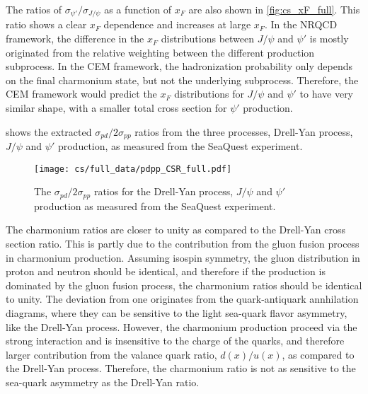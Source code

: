 \documentclass[../main.tex]{subfiles}
\begin{document}
The ratios of $\sigma_{\psi'}/\sigma_{J/\psi}$ as a function of $x_F$ are also shown in \cref{fig:cs_xF_full}.
This ratio shows a clear $x_F$ dependence and increases at large $x_F$. In the NRQCD framework,
the difference in the $x_F$ distributions between $J/\psi$ and $\psi'$ is mostly originated
from the relative weighting between the different production subprocess.
In the CEM framework, the hadronization probability only depends on
the final charmonium state, but not the underlying subprocess. Therefore, the CEM framework would predict
the $x_F$ distributions for $J/\psi$ and $\psi'$ to have very similar shape, with a smaller total cross section
for $\psi'$ production.

 shows the extracted $\sigma_{pd}/2\sigma_{pp}$ ratios from the three processes,
Drell-Yan process, $J/\psi$ and $\psi'$ production, as measured from the SeaQuest experiment.
\begin{figure}[h!]
	\centering
	\texttt{[image: cs/full\_data/pdpp\_CSR\_full.pdf]}
	\caption{The $\sigma_{pd}/2\sigma_{pp}$ ratios for the Drell-Yan process, $J/\psi$ and $\psi'$ production
		as measured from the SeaQuest experiment.
	}
	\label{fig:csr_all_process}
\end{figure}
The charmonium ratios are closer to unity as compared to the Drell-Yan cross section ratio. This
is partly due to the contribution from the gluon fusion process in charmonium production. Assuming
isospin symmetry, the gluon distribution in proton and neutron should be identical, and therefore
if the production is dominated by the gluon fusion process, the charmonium ratios should be identical
to unity. The deviation from one originates from the quark-antiquark annhilation diagrams, where they
can be sensitive to the light sea-quark flavor asymmetry, like the Drell-Yan process. However, the charmonium
production proceed via the strong interaction and is insensitive to the charge of the quarks, and therefore
larger contribution from the valance quark ratio, $d(x)/u(x)$, as compared to the Drell-Yan process. Therefore,
the charmonium ratio is not as sensitive to the sea-quark asymmetry as the Drell-Yan ratio.


\FloatBarrier
\end{document}
